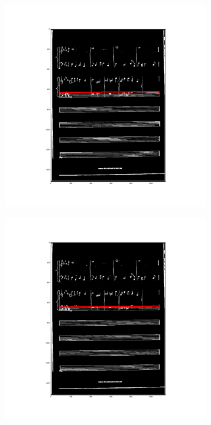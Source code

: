 \documentclass[12pt]{article}
\begin{document}
\begin{figure}[h!]
\begin{subfigure}[b]{0.32\linewidth}
		\end{subfigure}
		\begin{subfigure}[b]{0.32\linewidth}
			\includegraphics[width=\linewidth]{zdj/BFS16.png}
		\end{subfigure}
		\begin{subfigure}[b]{0.32\linewidth}
			\includegraphics[width=\linewidth]{zdj/BFS17.png}

\end{subfigure}
\end{figure}
\end{document}
